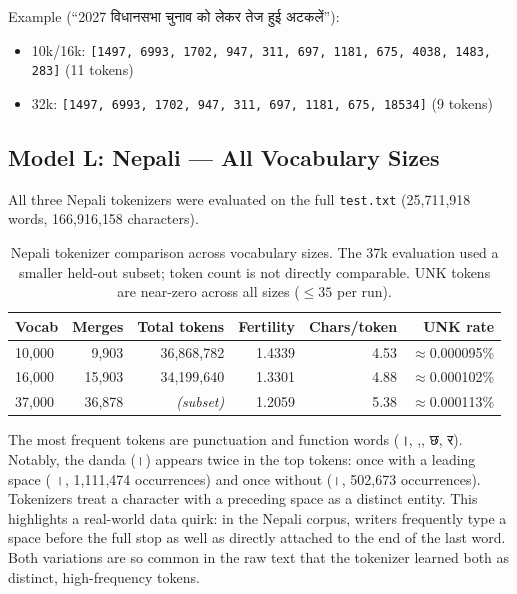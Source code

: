 \documentclass[11pt]{article}
\newcommand{\dn}[1]{{\devanagarifont #1}}
\begin{document}
Example (\dn{``2027 विधानसभा चुनाव को लेकर तेज हुई अटकलें''}):
\begin{itemize}[nosep]
    \item 10k/16k: \texttt{[1497, 6993, 1702, 947, 311, 697, 1181, 675, 4038, 1483, 283]} (11 tokens)
    \item 32k: \texttt{[1497, 6993, 1702, 947, 311, 697, 1181, 675, 18534]} (9 tokens)
\end{itemize}

\subsection{Model L: Nepali --- All Vocabulary Sizes}

All three Nepali tokenizers were evaluated on the full \texttt{test.txt} (25{,}711{,}918 words, 166{,}916{,}158 characters).

\begin{table}[h]
\centering
\begin{tabular}{lrrrrr}
\toprule
\textbf{Vocab} & \textbf{Merges} & \textbf{Total tokens} & \textbf{Fertility} & \textbf{Chars/token} & \textbf{UNK rate} \\
\midrule
10{,}000 & 9{,}903  & 36{,}868{,}782 & 1.4339 & 4.53 & $\approx$0.000095\% \\
16{,}000 & 15{,}903 & 34{,}199{,}640 & 1.3301 & 4.88 & $\approx$0.000102\% \\
37{,}000 & 36{,}878 & \textit{(subset)} & 1.2059 & 5.38 & $\approx$0.000113\% \\
\bottomrule
\end{tabular}
\caption{Nepali tokenizer comparison across vocabulary sizes. The 37k evaluation used a smaller held-out subset; token count is not directly comparable. UNK tokens are near-zero across all sizes ($\leq 35$ per run).}
\end{table}

The most frequent tokens are punctuation and function words (\dn{।}, \dn{,}, \dn{छ}, \dn{र}). Notably, the danda (\dn{।}) appears twice in the top tokens: once with a leading space (\dn{ ।}, 1{,}111{,}474 occurrences) and once without (\dn{।}, 502{,}673 occurrences). Tokenizers treat a character with a preceding space as a distinct entity. This highlights a real-world data quirk: in the Nepali corpus, writers frequently type a space before the full stop as well as directly attached to the end of the last word. Both variations are so common in the raw text that the tokenizer learned both as distinct, high-frequency tokens.
\end{document}
